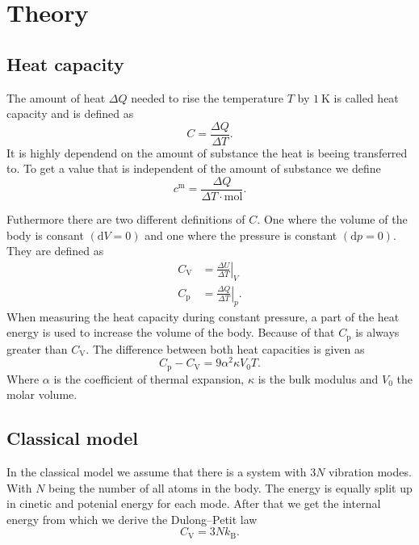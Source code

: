 \section{Theory}
\label{sec:Theory}

\subsection{Heat capacity}
\label{ssec:theory1}

The amount of heat $\Delta Q$ needed to rise the temperature $T$ by $\SI{1}{\kelvin}$ is called heat capacity and is defined as
\begin{equation}
    C = \frac{\Delta Q}{\Delta T}.
    \label{eq:heat}
\end{equation}
It is highly dependend on the amount of substance the heat is beeing transferred to.
To get a value that is independent of the amount of substance we define
\begin{equation}
    c^{\text{m}} = \frac{\Delta Q}{\Delta T \cdot \si{\mol}}.
    \label{eq:heat_mole}
\end{equation}

Futhermore there are two different definitions of $C$.
One where the volume of the body is consant $(\mathrm{d} V = 0)$ and one where the pressure is constant $(\mathrm{d} p = 0)$.
They are defined as 
\begin{align}
    C_\text{V} &= \left. \frac{\Delta U}{\Delta T} \right\vert_{V}\\ 
    C_\text{p} &= \left. \frac{\Delta Q}{\Delta T} \right\vert_{p}.
\end{align}
When measuring the heat capacity during constant pressure, a part of the heat energy is used to increase the volume of the body.
Because of that $C_\text{p}$ is always greater than $C_\text{V}$.
The difference between both heat capacities is given as
\begin{equation}
    C_\text{p} - C_\text{V} = 9 \alpha ^2 \kappa V_\text{0} T.
    \label{eq:heat_dif}
\end{equation}
Where $\alpha$ is the coefficient of thermal expansion, $\kappa$ is the bulk modulus and $V_\text{0}$ the molar volume.

\subsection{Classical model}
\label{ssec:theory2}

In the classical model we assume that there is a system with $3 N$ vibration modes.
With $N$ being the number of all atoms in the body.
The energy is equally split up in cinetic and potenial energy for each mode.
After that we get the internal energy from which we derive the Dulong–Petit law
\begin{equation}
    C_\text{V} = 3 N k_\text{B}.
    \label{eq:dulong}
\end{equation}


